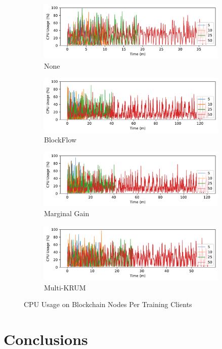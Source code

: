 \begin{figure}[!ht]
    \centering
    \begin{subfigure}[b]{0.49\textwidth}
        \centering
        \includegraphics[width=\textwidth]{graphics/clients/cpu_none_miner.pdf}
        \caption{None}
    \end{subfigure}
    \hfill
    \begin{subfigure}[b]{0.49\textwidth}
        \centering
        \includegraphics[width=\textwidth]{graphics/clients/cpu_blockflow_miner.pdf}
        \caption{BlockFlow}
    \end{subfigure}
    \hfill
    \begin{subfigure}[b]{0.49\textwidth}
        \centering
        \includegraphics[width=\textwidth]{graphics/clients/cpu_marginalgain_miner.pdf}
        \caption{Marginal Gain}
    \end{subfigure}
    \hfill
    \begin{subfigure}[b]{0.49\textwidth}
        \centering
        \includegraphics[width=\textwidth]{graphics/clients/cpu_multikrum_miner.pdf}
        \caption{Multi-KRUM}
    \end{subfigure}
    \caption{CPU Usage on Blockchain Nodes Per Training Clients}
    \label{fig:cpu_clients_degree_miner}
\end{figure}

\section{Conclusions} %
